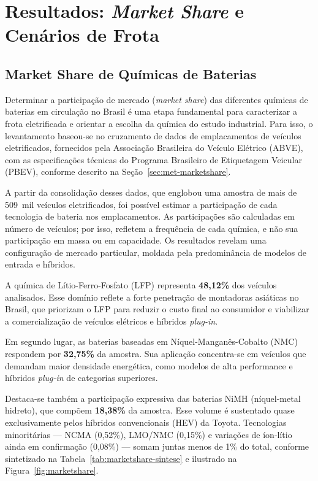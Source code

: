 \newpage
\section{Resultados: \textit{Market Share} e Cenários de Frota}
\label{sec:resultados}

\subsection{Market Share de Químicas de Baterias}
\label{sec:marketshare}

Determinar a participação de mercado (\textit{market share}) das diferentes
químicas de baterias em circulação no Brasil é uma etapa fundamental para
caracterizar a frota eletrificada e orientar a escolha da química do estudo
industrial. Para isso, o levantamento baseou-se no cruzamento de dados de
emplacamentos de veículos eletrificados, fornecidos pela Associação Brasileira do
Veículo Elétrico (ABVE), com as especificações técnicas do Programa Brasileiro de
Etiquetagem Veicular (PBEV), conforme descrito na Seção~\ref{sec:met-marketshare}.

A partir da consolidação desses dados, que englobou uma amostra de mais de
509~mil veículos eletrificados, foi possível estimar a participação de cada
tecnologia de bateria nos emplacamentos. As participações são calculadas em número
de veículos; por isso, refletem a frequência de cada química, e não sua
participação em massa ou em capacidade. Os resultados revelam uma configuração de
mercado particular, moldada pela predominância de modelos de entrada e híbridos.

A química de Lítio-Ferro-Fosfato (LFP) representa \textbf{48,12\%} dos veículos
analisados. Esse domínio reflete a forte penetração de montadoras asiáticas no
Brasil, que priorizam o LFP para reduzir o custo final ao consumidor e viabilizar
a comercialização de veículos elétricos e híbridos \textit{plug-in}.

Em segundo lugar, as baterias baseadas em Níquel-Manganês-Cobalto (NMC) respondem
por \textbf{32,75\%} da amostra. Sua aplicação concentra-se em veículos que
demandam maior densidade energética, como modelos de alta performance e híbridos
\textit{plug-in} de categorias superiores.

Destaca-se também a participação expressiva das baterias NiMH (níquel-metal
hidreto), que compõem \textbf{18,38\%} da amostra. Esse volume é sustentado quase
exclusivamente pelos híbridos convencionais (HEV) da Toyota. Tecnologias
minoritárias — NCMA (0,52\%), LMO/NMC (0,15\%) e variações de íon-lítio ainda em
confirmação (0,08\%) — somam juntas menos de 1\% do total, conforme sintetizado na
Tabela~\ref{tab:marketshare-sintese} e ilustrado na Figura~\ref{fig:marketshare}.

